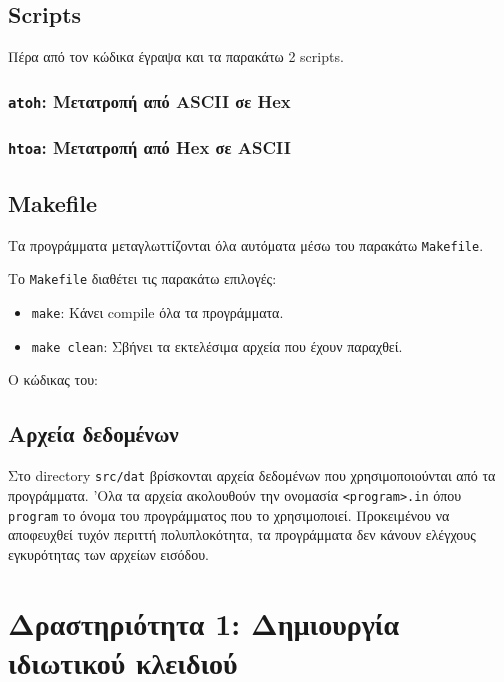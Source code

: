 \documentclass[12pt]{article}
\begin{document}
\subsection{Scripts}

Πέρα από τον κώδικα έγραψα και τα παρακάτω 2 scripts.

\subsubsection{\lstinline{atoh}: Μετατροπή από ASCII σε Hex}



\subsubsection{\lstinline{htoa}: Μετατροπή από Hex σε ASCII}



\subsection{Makefile}

Τα προγράμματα μεταγλωττίζονται όλα αυτόματα μέσω του παρακάτω
\lstinline{Makefile}.

Το \lstinline{Makefile} διαθέτει τις παρακάτω επιλογές:
\begin{itemize}
	\item \lstinline{make}: Κάνει compile όλα τα προγράμματα.
	\item \lstinline{make clean}: Σβήνει τα εκτελέσιμα αρχεία που έχουν
		παραχθεί.
\end{itemize}

Ο κώδικας του:



\subsection{Αρχεία δεδομένων}

Στο directory \lstinline{src/dat} βρίσκονται αρχεία δεδομένων που
χρησιμοποιούνται από τα προγράμματα. 'Ολα τα αρχεία ακολουθούν την ονομασία
\lstinline{<program>.in} όπου \lstinline{program} το όνομα του προγράμματος που
το χρησιμοποιεί. Προκειμένου να αποφευχθεί τυχόν περιττή πολυπλοκότητα, τα
προγράμματα δεν κάνουν ελέγχους εγκυρότητας των αρχείων εισόδου.

\section{Δραστηριότητα 1: Δημιουργία ιδιωτικού κλειδιού}
\end{document}
